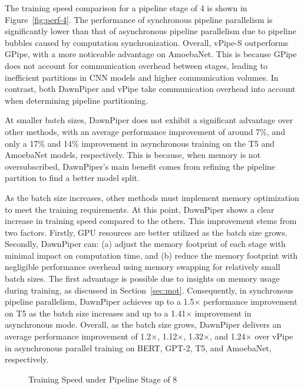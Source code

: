 The training speed comparison for a pipeline stage of 4 is shown in Figure~\ref{fig:perf-4}.
The performance of synchronous pipeline parallelism is significantly
lower than that of asynchronous pipeline parallelism due to pipeline bubbles caused by computation synchronization.
Overall, vPipe-S outperforms GPipe, with a more noticeable advantage on AmoebaNet.
This is because GPipe does not account for communication overhead between stages,
leading to inefficient partitions in CNN models and higher communication volumes.
In contrast, both DawnPiper and vPipe take communication overhead into account when determining pipeline partitioning.

At smaller batch sizes, DawnPiper does not exhibit a significant advantage over other methods,
with an average performance improvement of around 7\%,
and only a 17\% and 14\% improvement in asynchronous training on the T5 and AmoebaNet models, respectively.
This is because, when memory is not oversubscribed,
DawnPiper’s main benefit comes from refining the pipeline partition to find a better model split.

As the batch size increases, other methods must implement memory optimization to meet the training requirements.
At this point, DawnPiper shows a clear increase in training speed compared to the others.
This improvement stems from two factors. Firstly, GPU resources are better utilized as the batch size grows.
Secondly, DawnPiper can: (a) adjust the memory footprint of each stage with minimal impact on computation time,
and (b) reduce the memory footprint with negligible performance overhead using memory swapping for relatively small batch sizes.
The first advantage is possible due to insights on memory usage during training, as discussed in Section~\ref{sec:mot}.
Consequently, in synchronous pipeline parallelism,
DawnPiper achieves up to a 1.5$\times$ performance improvement on T5 as the batch size increases
and up to a 1.41$\times$ improvement in asynchronous mode.
Overall, as the batch size grows,
DawnPiper delivers an average performance improvement of 1.2$\times$, 1.12$\times$, 1.32$\times$, and 1.24$\times$ over vPipe
in asynchronous parallel training on BERT, GPT-2, T5, and AmoebaNet, respectively.
\begin{figure}
  \centering
  \caption{Training Speed under Pipeline Stage of 8}
  \label{fig:perf-8}
\end{figure}

